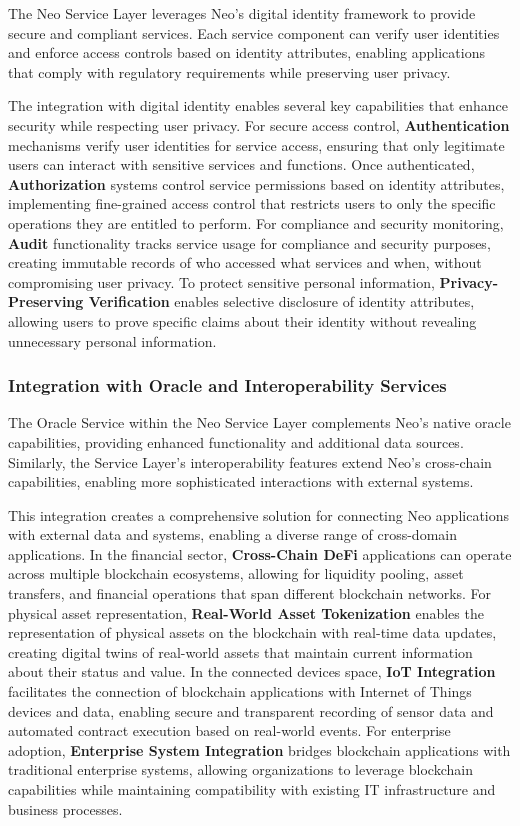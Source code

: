 \documentclass[11pt]{article}
\begin{document}
The Neo Service Layer leverages Neo's digital identity framework to provide secure and compliant services. Each service component can verify user identities and enforce access controls based on identity attributes, enabling applications that comply with regulatory requirements while preserving user privacy.

The integration with digital identity enables several key capabilities that enhance security while respecting user privacy. For secure access control, \textbf{Authentication} mechanisms verify user identities for service access, ensuring that only legitimate users can interact with sensitive services and functions. Once authenticated, \textbf{Authorization} systems control service permissions based on identity attributes, implementing fine-grained access control that restricts users to only the specific operations they are entitled to perform. For compliance and security monitoring, \textbf{Audit} functionality tracks service usage for compliance and security purposes, creating immutable records of who accessed what services and when, without compromising user privacy. To protect sensitive personal information, \textbf{Privacy-Preserving Verification} enables selective disclosure of identity attributes, allowing users to prove specific claims about their identity without revealing unnecessary personal information.

\subsubsection{Integration with Oracle and Interoperability Services}
\label{subsubsec:oracle-interop-integration}

The Oracle Service within the Neo Service Layer complements Neo's native oracle capabilities, providing enhanced functionality and additional data sources. Similarly, the Service Layer's interoperability features extend Neo's cross-chain capabilities, enabling more sophisticated interactions with external systems.

This integration creates a comprehensive solution for connecting Neo applications with external data and systems, enabling a diverse range of cross-domain applications. In the financial sector, \textbf{Cross-Chain DeFi} applications can operate across multiple blockchain ecosystems, allowing for liquidity pooling, asset transfers, and financial operations that span different blockchain networks. For physical asset representation, \textbf{Real-World Asset Tokenization} enables the representation of physical assets on the blockchain with real-time data updates, creating digital twins of real-world assets that maintain current information about their status and value. In the connected devices space, \textbf{IoT Integration} facilitates the connection of blockchain applications with Internet of Things devices and data, enabling secure and transparent recording of sensor data and automated contract execution based on real-world events. For enterprise adoption, \textbf{Enterprise System Integration} bridges blockchain applications with traditional enterprise systems, allowing organizations to leverage blockchain capabilities while maintaining compatibility with existing IT infrastructure and business processes.
\end{document}

